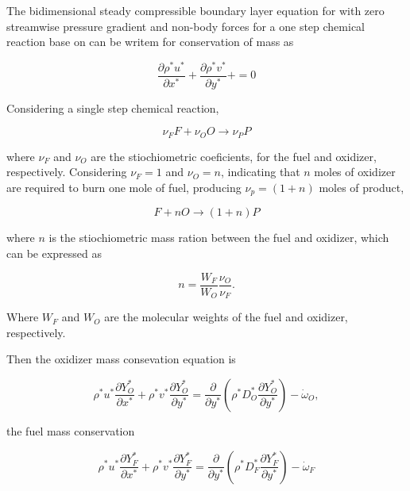 The bidimensional steady compressible boundary layer equation for with zero
streamwise pressure gradient and non-body forces for a one step chemical
reaction base on \cite{planche1992numerical} can be writem for  conservation of mass as   


\begin{equation} 
\frac{\partial \rho^* u^* }{\partial x^*}+
\frac{\partial \rho^* v^* }{\partial y^*}+
=0
\end{equation}

Considering a single step chemical reaction,

\begin{equation}
\nu_F F + \nu_O O \rightarrow \nu_P P
\end{equation}

where $\nu_F$ and $\nu_O$
are the stiochiometric coeficients, for the 
fuel and oxidizer, respectively. 
Considering $\nu_F=1$ and $\nu_O=n$, indicating that 
$n$ moles of oxidizer are
required to burn one mole of fuel, producing $\nu_p=(1+n)$ moles of product,

\begin{equation}
F + n O \rightarrow (1+n)P
\end{equation}

where $n$ is the stiochiometric 
mass ration between the fuel and oxidizer, which can be expressed as

\begin{equation}
n=\frac{W_F}{W_O}\frac{\nu_O}{\nu_F}
.
\end{equation}

Where $W_F$ and $W_O$ are the molecular 
weights of the fuel and oxidizer, respectively.

Then the oxidizer mass consevation equation is 

\begin{equation} 
\rho^* u^*\frac{\partial Y_{O}^*}{\partial x^*}+
\rho^* v^*\frac{\partial Y_{O}^*}{\partial y^*}
=
\frac{\partial}{\partial y^*}
\left(\rho^* D_{O}^{*}\frac{\partial Y_O^{*}}{\partial y^{*}}\right)
-
\dot{\omega}_O
,
\end{equation} 

the fuel mass conservation

\begin{equation} 
\rho^* u^*\frac{\partial Y_{F}^*}{\partial x^*}+
\rho^* v^*\frac{\partial Y_{F}^*}{\partial y^*}
=
\frac{\partial}{\partial y^*}
\left(\rho^* D_{F}^{*}\frac{\partial Y_F^{*}}{\partial y^{*}}\right)
-
\dot{\omega}_F
\end{equation} 

